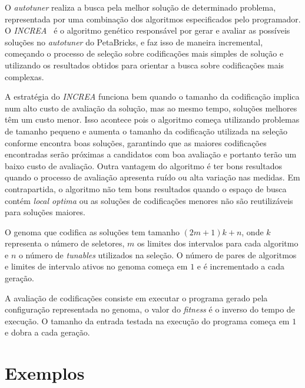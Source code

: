\documentclass[a4paper, 11pt, twoside]{article}
\begin{document}
O \emph{autotuner} realiza a busca pela melhor solução de determinado problema,
representada por uma combinação dos algoritmos especificados pelo programador.
O \emph{INCREA}~\cite{ansel2011efficient} é o algoritmo genético responsável
por gerar e avaliar as possíveis soluções no \emph{autotuner} do PetaBricks, e 
faz isso de maneira incremental, começando o processo de seleção sobre 
codificações mais simples de solução e utilizando os resultados obtidos para 
orientar a busca sobre codificações mais complexas.

A estratégia do \emph{INCREA} funciona bem quando o tamanho da codificação
implica num alto custo de avaliação da solução, mas ao mesmo tempo, soluções
melhores têm um custo menor. Isso acontece pois o algoritmo começa utilizando
problemas de tamanho pequeno e aumenta o tamanho da codificação utilizada na 
seleção conforme encontra boas soluções, garantindo que as maiores codificações
encontradas serão próximas a candidatos com boa avaliação e portanto terão um
baixo custo de avaliação. Outra vantagem do algoritmo é ter bons resultados
quando o processo de avaliação apresenta ruído ou alta variação nas medidas.
Em contrapartida, o algoritmo não tem bons resultados quando o espaço de busca
contém \emph{local optima} ou as soluções de codificações menores não são
reutilizáveis para soluções maiores.

O genoma que codifica as soluções tem tamanho $(2m + 1)k + n$,
onde $k$ representa o número de seletores, $m$ os limites dos intervalos para 
cada algoritmo e $n$ o número de \emph{tunables} utilizados na seleção. O
número de pares de algoritmos e limites de intervalo ativos no genoma começa
em $1$ e é incrementado a cada geração.

A avaliação de codificações consiste em executar o programa gerado pela
configuração representada no genoma, o valor do \emph{fitness} é o inverso
do tempo de execução. O tamanho da entrada testada na execução do programa
começa em $1$ e dobra a cada geração.

\section{Exemplos}

\newpage


\end{document}
